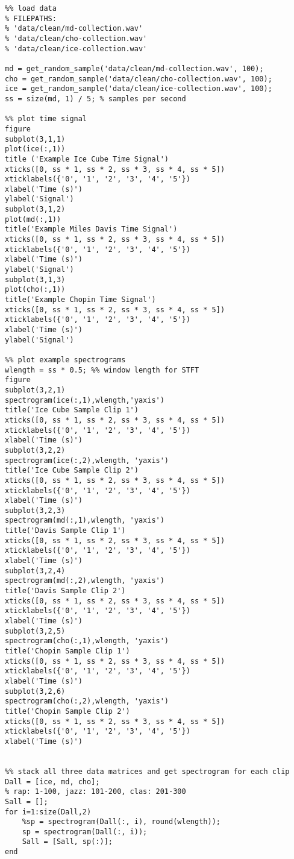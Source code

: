 \documentclass[12pt, a4paper]{article}
\begin{document}
\begin{verbatim}
%% load data
% FILEPATHS:
% 'data/clean/md-collection.wav'
% 'data/clean/cho-collection.wav'
% 'data/clean/ice-collection.wav'

md = get_random_sample('data/clean/md-collection.wav', 100);
cho = get_random_sample('data/clean/cho-collection.wav', 100);
ice = get_random_sample('data/clean/ice-collection.wav', 100);
ss = size(md, 1) / 5; % samples per second

%% plot time signal
figure
subplot(3,1,1)
plot(ice(:,1))
title ('Example Ice Cube Time Signal')
xticks([0, ss * 1, ss * 2, ss * 3, ss * 4, ss * 5])
xticklabels({'0', '1', '2', '3', '4', '5'})
xlabel('Time (s)')
ylabel('Signal')
subplot(3,1,2)
plot(md(:,1))
title('Example Miles Davis Time Signal')
xticks([0, ss * 1, ss * 2, ss * 3, ss * 4, ss * 5])
xticklabels({'0', '1', '2', '3', '4', '5'})
xlabel('Time (s)')
ylabel('Signal')
subplot(3,1,3)
plot(cho(:,1))
title('Example Chopin Time Signal')
xticks([0, ss * 1, ss * 2, ss * 3, ss * 4, ss * 5])
xticklabels({'0', '1', '2', '3', '4', '5'})
xlabel('Time (s)')
ylabel('Signal')

%% plot example spectrograms
wlength = ss * 0.5; %% window length for STFT
figure
subplot(3,2,1)
spectrogram(ice(:,1),wlength,'yaxis')
title('Ice Cube Sample Clip 1')
xticks([0, ss * 1, ss * 2, ss * 3, ss * 4, ss * 5])
xticklabels({'0', '1', '2', '3', '4', '5'})
xlabel('Time (s)')
subplot(3,2,2)
spectrogram(ice(:,2),wlength, 'yaxis')
title('Ice Cube Sample Clip 2')
xticks([0, ss * 1, ss * 2, ss * 3, ss * 4, ss * 5])
xticklabels({'0', '1', '2', '3', '4', '5'})
xlabel('Time (s)')
subplot(3,2,3)
spectrogram(md(:,1),wlength, 'yaxis')
title('Davis Sample Clip 1')
xticks([0, ss * 1, ss * 2, ss * 3, ss * 4, ss * 5])
xticklabels({'0', '1', '2', '3', '4', '5'})
xlabel('Time (s)')
subplot(3,2,4)
spectrogram(md(:,2),wlength, 'yaxis')
title('Davis Sample Clip 2')
xticks([0, ss * 1, ss * 2, ss * 3, ss * 4, ss * 5])
xticklabels({'0', '1', '2', '3', '4', '5'})
xlabel('Time (s)')
subplot(3,2,5)
spectrogram(cho(:,1),wlength, 'yaxis')
title('Chopin Sample Clip 1')
xticks([0, ss * 1, ss * 2, ss * 3, ss * 4, ss * 5])
xticklabels({'0', '1', '2', '3', '4', '5'})
xlabel('Time (s)')
subplot(3,2,6)
spectrogram(cho(:,2),wlength, 'yaxis')
title('Chopin Sample Clip 2')
xticks([0, ss * 1, ss * 2, ss * 3, ss * 4, ss * 5])
xticklabels({'0', '1', '2', '3', '4', '5'})
xlabel('Time (s)')


%% stack all three data matrices and get spectrogram for each clip
Dall = [ice, md, cho];
% rap: 1-100, jazz: 101-200, clas: 201-300
Sall = [];
for i=1:size(Dall,2)
    %sp = spectrogram(Dall(:, i), round(wlength));
    sp = spectrogram(Dall(:, i));
    Sall = [Sall, sp(:)];
end



\end{verbatim}
\end{document}
